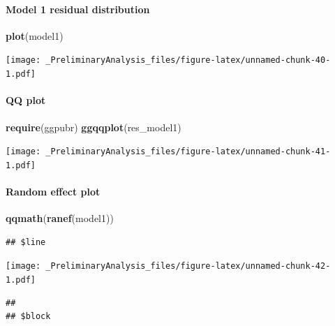 \documentclass[
]{article}
\newenvironment{Shaded}{\begin{snugshade}}{\end{snugshade}}
\newcommand{\KeywordTok}[1]{\textcolor[rgb]{0.13,0.29,0.53}{\textbf{#1}}}
\newcommand{\NormalTok}[1]{#1}
\begin{document}
\hypertarget{model-1-residual-distribution-1}{%
\paragraph{Model 1 residual
distribution}\label{model-1-residual-distribution-1}}

\begin{Shaded}
\begin{Highlighting}[]
\KeywordTok{plot}\NormalTok{(model1)}
\end{Highlighting}
\end{Shaded}

\texttt{[image: \_PreliminaryAnalysis\_files/figure-latex/unnamed-chunk-40-1.pdf]}

\hypertarget{qq-plot-1}{%
\paragraph{QQ plot}\label{qq-plot-1}}

\begin{Shaded}
\begin{Highlighting}[]
\KeywordTok{require}\NormalTok{(ggpubr)}
\KeywordTok{ggqqplot}\NormalTok{(res_model1)}
\end{Highlighting}
\end{Shaded}

\texttt{[image: \_PreliminaryAnalysis\_files/figure-latex/unnamed-chunk-41-1.pdf]}

\hypertarget{random-effect-plot-1}{%
\paragraph{Random effect plot}\label{random-effect-plot-1}}

\begin{Shaded}
\begin{Highlighting}[]
\KeywordTok{qqmath}\NormalTok{(}\KeywordTok{ranef}\NormalTok{(model1))}
\end{Highlighting}
\end{Shaded}

\begin{verbatim}
## $line
\end{verbatim}

\texttt{[image: \_PreliminaryAnalysis\_files/figure-latex/unnamed-chunk-42-1.pdf]}

\begin{verbatim}
## 
## $block
\end{verbatim}
\end{document}
